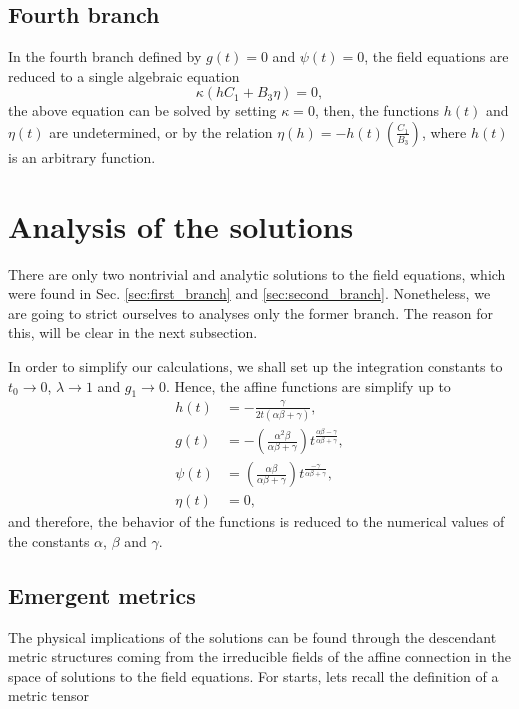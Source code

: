 \subsection{Fourth branch}

In the fourth branch defined by $g(t) = 0$ and $\psi (t) = 0$, the field equations are reduced
to a single algebraic equation
\begin{equation}
    \kappa\left(hC_1 + B_3\eta\right) = 0,
\end{equation}
the above equation can be solved by setting $\kappa = 0$, then, the functions $h(t)$ and $\eta(t)$ are undetermined,
or by the relation $\eta(h) = - h(t)\left(\frac{C_1}{B_3}\right)$, where $h(t)$ is an arbitrary function.

\section{Analysis of the solutions}
\label{sec:analysis}

There are only two nontrivial and analytic solutions to the field equations, which were found
in Sec. \ref{sec:first_branch} and \ref{sec:second_branch}. Nonetheless, 
we are going to strict ourselves to analyses only the former branch.  The reason for this, will be
clear in the next subsection.

In order to simplify our calculations, we shall set up the integration constants 
to $t_0 \to 0$, $\lambda \to 1$ and $g_1 \to 0$. Hence, the affine functions 
are simplify up to
\begin{align}
	h(t) & = -\frac{\gamma}{2t\left(\alpha\beta + \gamma\right)}, \label{sol_h}\\
	g(t) & = -\left(\frac{\alpha^2\beta}{\alpha\beta + \gamma}\right)t^{\frac{\alpha\beta - \gamma}{\alpha\beta + \gamma}}, \label{sol_g} \\
	\psi(t) & =\left(\frac{\alpha\beta}{\alpha\beta + \gamma}\right)t^{\frac{-\gamma}{\alpha\beta + \gamma}},  \label{sol_p}\\ 
	\eta(t) & = 0, \label{sol_n}
\end{align}
and therefore, the behavior of the functions is reduced to the numerical values of the
constants $\alpha$, $\beta$ and $\gamma$.


\subsection{Emergent metrics}

The physical implications of the solutions can be found through the descendant 
metric structures coming from the irreducible fields 
of the affine connection in the space of solutions to the field equations. 
For starts, lets recall the definition of a metric tensor

